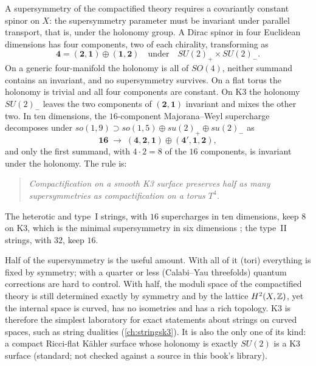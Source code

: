 A supersymmetry of the compactified theory requires a covariantly constant spinor on $X$:
the supersymmetry parameter must be invariant under parallel transport, that is, under the
holonomy group. A Dirac spinor in four Euclidean dimensions has four components, two of each
chirality, transforming as
\begin{equation}\label{eq:k3:spinor4}
  \mathbf4=(\mathbf2,\mathbf1)\oplus(\mathbf1,\mathbf2)
  \quad\text{under}\quad SU(2)_+\times SU(2)_- .
\end{equation}
On a generic four-manifold the holonomy is all of $SO(4)$, neither summand contains an
invariant, and no supersymmetry survives. On a flat torus the holonomy is trivial and all four
components are constant. On K3 the holonomy $SU(2)_-$ leaves the two components of
$(\mathbf2,\mathbf1)$ invariant and mixes the other two. In ten dimensions, the
$16$-component Majorana--Weyl supercharge decomposes under $so(1,9)\supset so(1,5)\oplus
su(2)_+\oplus su(2)_-$ as
\begin{equation}\label{eq:k3:16}
  \mathbf{16}\;\to\;(\mathbf4,\mathbf2,\mathbf1)\oplus(\mathbf4',\mathbf1,\mathbf2),
\end{equation}
and only the first summand, with $4\cdot2=8$ of the $16$ components, is invariant under the
holonomy.  The rule is:
\begin{quote}
\emph{Compactification on a smooth K3 surface preserves half as many supersymmetries as
compactification on a torus $T^4$.}
\end{quote}
The heterotic and type~I strings, with $16$ supercharges in ten dimensions, keep $8$ on K3,
which is the minimal supersymmetry in six dimensions ; the
type~II strings, with $32$, keep $16$.

\begin{physicsbox}
Half of the supersymmetry is the useful amount. With all of it (tori) everything is fixed by
symmetry; with a quarter or less (Calabi--Yau threefolds) quantum corrections are hard to
control. With half, the moduli space of the compactified theory is still determined exactly by
symmetry and by the lattice $H^2(X,\mathbb{Z})$, yet the internal space is curved, has no isometries
and has a rich topology. K3 is therefore the simplest laboratory for exact statements about
strings on curved spaces, such as string dualities (\cref{ch:stringsk3}). It is also the only
one of its kind: a compact Ricci-flat Kähler surface whose holonomy is exactly $SU(2)$ is a K3
surface (standard; not checked against a source in this book's library).
\end{physicsbox}

